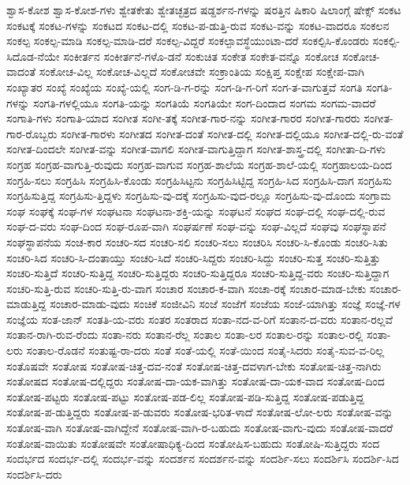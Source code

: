{ಶ್ವಾಸ-ಕೋಶ
ಶ್ವಾಸ-ಕೋಶ-ಗಳು
ಶ್ವೇತಕೇತು
ಶ್ವೇತಚ್ಛತ್ರದ
ಷಡ್ದರ್ಶನ-ಗಳನ್ನು
ಷರತ್ತಿನ
ಷಿಕಾರಿ
ಷಿಲಾಂಗ್ಗೆ
ಷೇಕ್ಸ್
ಸಂಕಟ
ಸಂಕಟಕ್ಕೆ
ಸಂಕಟ-ಗಳನ್ನು
ಸಂಕಟದ
ಸಂಕಟ-ದಲ್ಲಿ
ಸಂಕಟ-ಪ-ಡುತ್ತಿ-ರುವ
ಸಂಕಟ-ವನ್ನು
ಸಂಕಟ-ವಾದರೂ
ಸಂಕಲನ
ಸಂಕಲ್ಪ
ಸಂಕಲ್ಪ-ಮಾಡಿ
ಸಂಕಲ್ಪ-ಮಾಡಿ-ದರೆ
ಸಂಕಲ್ಪ-ವಿದ್ದರೆ
ಸಂಕಲ್ಪಾವಸ್ಥೆಯುಂಟಾ-ದರೆ
ಸಂಕಲ್ಪಿಸಿ-ಕೊಂಡರು
ಸಂಕಲ್ಪಿ-ಸಿದೊಡ-ನೆಯೇ
ಸಂಕೀರ್ತನ
ಸಂಕೀರ್ತನೆ-ಗಳೊ-ಡನೆ
ಸಂಕುಚಿತ
ಸಂಕೇತ
ಸಂಕೇತ-ವನ್ನೊ
ಸಂಕೋಚ
ಸಂಕೋಚ-ವಾದಂತೆ
ಸಂಕೋಚ-ವಿಲ್ಲ
ಸಂಕೋಚ-ವಿಲ್ಲದೆ
ಸಂಕೋಚವೇ
ಸಂಕ್ರಾಂತಿಯ
ಸಂಕ್ಷಿಪ್ತ
ಸಂಕ್ಷೇಪ
ಸಂಕ್ಷೇಪ-ವಾಗಿ
ಸಂಖ್ಯಾತರ
ಸಂಖ್ಯೆ
ಸಂಖ್ಯೆಯ
ಸಂಖ್ಯೆ-ಯಲ್ಲಿ
ಸಂಗ-ಡಿ-ಗ-ರನ್ನು
ಸಂಗ-ಡಿ-ಗ-ರಿಗೆ
ಸಂಗ-ತ-ವಾಗುತ್ತವೆ
ಸಂಗತಿ
ಸಂಗತಿ-ಗಳನ್ನು
ಸಂಗತಿ-ಗಳಲ್ಲಿಯೂ
ಸಂಗತಿ-ಯನ್ನು
ಸಂಗತಿಯೆ
ಸಂಗತಿಯೇ
ಸಂಗ-ದಿಂದಾದ
ಸಂಗಮ
ಸಂಗಮ-ವಾದರೆ
ಸಂಗಾತಿ-ಗಳು
ಸಂಗಾತಿ-ಯಾದ
ಸಂಗೀತ
ಸಂಗೀ-ತಕ್ಕೆ
ಸಂಗೀತ-ಗಾರ-ನನ್ನು
ಸಂಗೀತ-ಗಾರರ
ಸಂಗೀತ-ಗಾರರು
ಸಂಗೀತ-ಗಾರ-ರೊಬ್ಬರು
ಸಂಗೀತ-ಗಾರಳು
ಸಂಗೀತದ
ಸಂಗೀತ-ದಂತೆ
ಸಂಗೀತ-ದಲ್ಲಿ
ಸಂಗೀತ-ದಲ್ಲಿಯೂ
ಸಂಗೀತ-ದಲ್ಲಿ-ರು-ವಂತೆ
ಸಂಗೀತ-ದಿಂದಲೇ
ಸಂಗೀತ-ವನ್ನು
ಸಂಗೀತ-ವಾಗಲಿ
ಸಂಗೀತ-ವಾಗುತ್ತಿದ್ದಾಗ
ಸಂಗೀತ-ಶಾಸ್ತ್ರ-ದಲ್ಲಿ
ಸಂಗೀತಾ-ದಿ-ಗಳು
ಸಂಗ್ರಹ
ಸಂಗ್ರಹ-ವಾಗುತ್ತಿ-ರುವುದು
ಸಂಗ್ರಹ-ವಾಗುವ
ಸಂಗ್ರಹ-ಶಾಲೆಯ
ಸಂಗ್ರಹ-ಶಾಲೆ-ಯಲ್ಲಿ
ಸಂಗ್ರಹಾಲಯ-ದಿಂದ
ಸಂಗ್ರಹಿ-ಸಲು
ಸಂಗ್ರಹಿಸಿ
ಸಂಗ್ರಹಿಸಿ-ಕೊಂಡು
ಸಂಗ್ರಹಿಸಿಟ್ಟನು
ಸಂಗ್ರಹಿಸಿಟ್ಟಿದ್ದ
ಸಂಗ್ರಹಿ-ಸಿದ
ಸಂಗ್ರಹಿಸಿ-ದಾಗ
ಸಂಗ್ರಹಿಸು
ಸಂಗ್ರಹಿಸುತ್ತಿದ್ದ
ಸಂಗ್ರಹಿಸು-ತ್ತಿದ್ದಳು
ಸಂಗ್ರಹಿಸು-ವು-ದಕ್ಕೆ
ಸಂಗ್ರಹಿಸು-ವುದ-ರಲ್ಲೂ
ಸಂಗ್ರಹಿಸು-ವು-ದೊಂದು
ಸಂಗ್ರಾಮ
ಸಂಘ
ಸಂಘಕ್ಕೆ
ಸಂಘ-ಗಳ
ಸಂಘಟನಾ
ಸಂಘಟನಾ-ಶಕ್ತಿ-ಯನ್ನು
ಸಂಘಟನೆ
ಸಂಘದ
ಸಂಘ-ದಲ್ಲಿ
ಸಂಘ-ದಲ್ಲಿ-ರುವ
ಸಂಘ-ದ-ವರು
ಸಂಘ-ದಿಂದ
ಸಂಘ-ರೂಪ-ವಾಗಿ
ಸಂಘರ್ಷಣೆ
ಸಂಘ-ವನ್ನು
ಸಂಘ-ವಿಲ್ಲದೆ
ಸಂಘವು
ಸಂಘಸ್ಥಾಪನೆ
ಸಂಘಸ್ಥಾಪನೆಯ
ಸಂಚ-ಕಾರ
ಸಂಚರಿ-ಸದ
ಸಂಚರಿ-ಸಲಿ
ಸಂಚರಿ-ಸಲು
ಸಂಚರಿಸಿ
ಸಂಚರಿ-ಸಿ-ಕೊಂಡು
ಸಂಚರಿ-ಸಿತು
ಸಂಚರಿ-ಸಿದ
ಸಂಚರಿ-ಸಿ-ದಂತಾಯ್ತು
ಸಂಚರಿ-ಸಿದೆ
ಸಂಚರಿ-ಸಿದ್ದರು
ಸಂಚರಿ-ಸಿದ್ದು
ಸಂಚರಿ-ಸುತ್ತ
ಸಂಚರಿ-ಸುತ್ತಿತ್ತು
ಸಂಚರಿ-ಸುತ್ತಿದೆ
ಸಂಚರಿ-ಸುತ್ತಿದ್ದ
ಸಂಚರಿ-ಸುತ್ತಿದ್ದರು
ಸಂಚರಿ-ಸುತ್ತಿದ್ದರೂ
ಸಂಚರಿ-ಸುತ್ತಿದ್ದ-ವರು
ಸಂಚರಿ-ಸುತ್ತಿದ್ದಾಗ
ಸಂಚರಿ-ಸುತ್ತಿ-ರುವ
ಸಂಚರಿ-ಸುತ್ತಿ-ರು-ವಾಗ
ಸಂಚಾರ
ಸಂಚಾರ-ಕ-ವಾಗಿ
ಸಂಚಾ-ರಕ್ಕೆ
ಸಂಚಾರ-ಮಾಡ-ಬೇಕು
ಸಂಚಾರ-ಮಾಡುತ್ತಿದ್ದ
ಸಂಚಾರ-ಮಾಡು-ವುದು
ಸಂಚಿಕೆ
ಸಂಜೀವಿನಿ
ಸಂಜೆ
ಸಂಜೆಗೆ
ಸಂಜೆಯ
ಸಂಜೆ-ಯಾಗಿತ್ತು
ಸಂಜ್ಞೆ
ಸಂಜ್ಞೆ-ಗಳ
ಸಂಜ್ಞೆಯ
ಸಂತ-ಜಾನ್
ಸಂತತಿ-ಯ-ವರು
ಸಂತರ
ಸಂತರಾದ
ಸಂತಾ-ನದ-ವ-ರಿಗೆ
ಸಂತಾನ-ದ-ವರು
ಸಂತಾನ-ರಲ್ಲವೆ
ಸಂತಾನ-ರಾಗಿ-ರುವ-ರೆಂದು
ಸಂತಾ-ನರು
ಸಂತಾನ-ರೆಲ್ಲ
ಸಂತಾಲ
ಸಂತಾ-ಲರ
ಸಂತಾಲ-ರನ್ನು
ಸಂತಾಲ-ರಲ್ಲಿ
ಸಂತಾ-ಲರು
ಸಂತಾಲ-ರೊಡನೆ
ಸಂತುಷ್ಟ-ರಾ-ದರು
ಸಂತೆ
ಸಂತೆ-ಯಲ್ಲಿ
ಸಂತೆ-ಯಿಂದ
ಸಂತೈ-ಸಿದರು
ಸಂತೈ-ಸುವ-ವ-ರಿಲ್ಲ
ಸಂತೊಷವೇ
ಸಂತೋಷ
ಸಂತೋಷ-ಚಿತ್ತ-ದವ-ನಂತೆ
ಸಂತೋಷ-ಚಿತ್ತ-ದವಳಾಗ-ಬೇಕು
ಸಂತೋಷ-ಚಿತ್ತ-ನಾಗಿರು
ಸಂತೋಷದ
ಸಂತೋಷ-ದಲ್ಲಿದ್ದರು
ಸಂತೋಷ-ದಾ-ಯಕ-ವಾಗಿತ್ತು
ಸಂತೋಷ-ದಾ-ಯಕ-ವಾದ
ಸಂತೋಷ-ದಿಂದ
ಸಂತೋಷ-ಪಟ್ಟರು
ಸಂತೋಷ-ಪಟ್ಟು
ಸಂತೋಷ-ಪಡ-ಲಿಲ್ಲ
ಸಂತೋಷ-ಪಡಿ-ಸುತ್ತಿದ್ದ
ಸಂತೋಷ-ಪಡುತ್ತಿದ್ದ
ಸಂತೋಷ-ಪ-ಡುತ್ತಿದ್ದರು
ಸಂತೋಷ-ಪ-ಡುವರು
ಸಂತೋಷ-ಭರಿತ-ಳಾದೆ
ಸಂತೋಷ-ಲೋ-ಲರು
ಸಂತೋಷ-ವನ್ನು
ಸಂತೋಷ-ವಾಗಿ
ಸಂತೋಷ-ವಾಗಿದ್ದೇನೆ
ಸಂತೋಷ-ವಾಗಿ-ರ-ಬಹುದು
ಸಂತೋಷ-ವಾಗು-ವುದು
ಸಂತೋಷ-ವಾದರೆ
ಸಂತೋಷ-ವಾಯಿತು
ಸಂತೋಷವೇ
ಸಂತೋಷಾಧಿಕ್ಯ-ದಿಂದ
ಸಂತೋಷಿಸ-ಬಹುದು
ಸಂತೋಷಿ-ಸುತ್ತಿದ್ದರು
ಸಂದ
ಸಂದರ್ಭದ
ಸಂದರ್ಭ-ದಲ್ಲಿ
ಸಂದರ್ಭ-ವನ್ನು
ಸಂದರ್ಶನ
ಸಂದರ್ಶನ-ವನ್ನು
ಸಂದರ್ಶಿ-ಸಲು
ಸಂದರ್ಶಿಸಿ
ಸಂದರ್ಶಿ-ಸಿದ
ಸಂದರ್ಶಿಸಿ-ದರು
}
